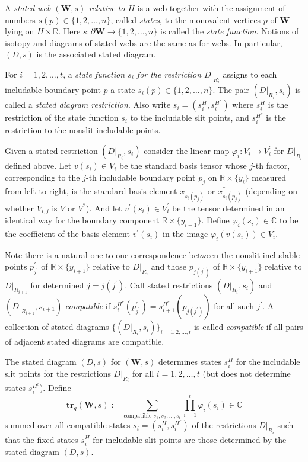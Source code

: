 \documentclass[12pt, reqno]{amsart}
\theoremstyle{definition}
\newcommand{\R}{\mathbb{R}}%
\newcommand{\trq}{\mathbf{tr}_q}%
\begin{document}
A \emph{stated web $(\mathbf{W},s)$ relative to $H$} is a web together with the assignment of numbers $s(p)\in\{1,2,\dots,n\}$, called \emph{states}, to the monovalent vertices $p$ of $\mathbf{W}$ lying on $H\times\R$.  Here $s:\partial \mathbf{W}\to\{1,2,\dots,n\}$ is called the \emph{state function}.  Notions of isotopy and diagrams of stated webs are the same as for webs.  In particular, $(D,s)$ is the associated stated diagram.  

For $i=1,2,\dots,t$, a \emph{state function $s_i$ for the restriction $D|_{R_i}$} assigns to each includable boundary point $p$ a state $s_i(p)\in\{1,2,\dots,n\}$.  The pair $(D|_{R_i},s_i)$ is called a \emph{stated diagram restriction}.  Also write $s_i=(s_i^H,s_i^{H^c})$ where $s_i^H$ is the restriction of the state function $s_i$ to the includable slit points, and $s_i^{H^c}$ is the restriction to the nonslit includable points.  

Given a stated restriction $(D|_{R_i},s_i)$ consider the linear map $\varphi_i:V_i\to V^\prime_i$ for $D|_{R_i}$ defined above.  Let $v(s_i)\in V_i$ be the standard basis tensor whose $j$-th factor, corresponding to the $j$-th includable boundary point $p_j$ on $\R\times\{y_i\}$ measured from left to right, is the standard basis element $x_{s_i(p_j)}$ or $x^*_{s_i(p_j)}$ (depending on whether $V_{i,j}$ is $V$ or $V^*$).  And let $v^\prime(s_i)\in V^\prime_i$ be the tensor determined in an identical way for the boundary component $\R\times\{y_{i+1}\}$.  Define $\varphi_i(s_i)\in\mathbb{C}$ to be the coefficient of the basis element $v^\prime(s_i)$ in the image $\varphi_i(v(s_i))\in V^\prime_i$.  

Note there is a natural one-to-one correspondence between the nonslit includable points $p^\prime_{j^\prime}$ of $\R\times\{y_{i+1}\}$ relative to $D|_{R_i}$ and those $p_{j(j^\prime)}$ of $\R\times\{y_{i+1}\}$ relative to $D|_{R_{i+1}}$ for determined $j=j(j^\prime)$.  Call stated restrictions $(D|_{R_i},s_i)$ and $(D|_{R_{i+1}},s_{i+1})$ \emph{compatible} if $s_i^{H^c}(p^\prime_{j^\prime})=s_{i+1}^{H^c}(p_{j(j^\prime)})$ for all such $j^\prime$.  A collection of stated diagrams $\{(D|_{R_i},s_i)\}_{i=1,2,\dots,t}$ is called \emph{compatible} if all pairs of adjacent stated diagrams are compatible.  

The stated diagram $(D,s)$ for $(\mathbf{W},s)$ determines states $s_i^H$ for the includable slit points for the restrictions $D|_{R_i}$ for all $i=1,2,\dots,t$ (but does not determine states $s_i^{H^c}$).  Define 
$$
\trq(\mathbf{W},s):=\sum_{\text{compatible }s_1,s_2,\dots,s_t}\prod_{i=1}^t \varphi_i(s_i)\in\mathbb{C}
$$ 
summed over all compatible states $s_i=(s_i^H,s_i^{H^c})$ of the restrictions $D|_{R_i}$ such that the fixed states $s_i^H$ for includable slit points are those determined by the stated diagram $(D,s)$.  
\end{document}
